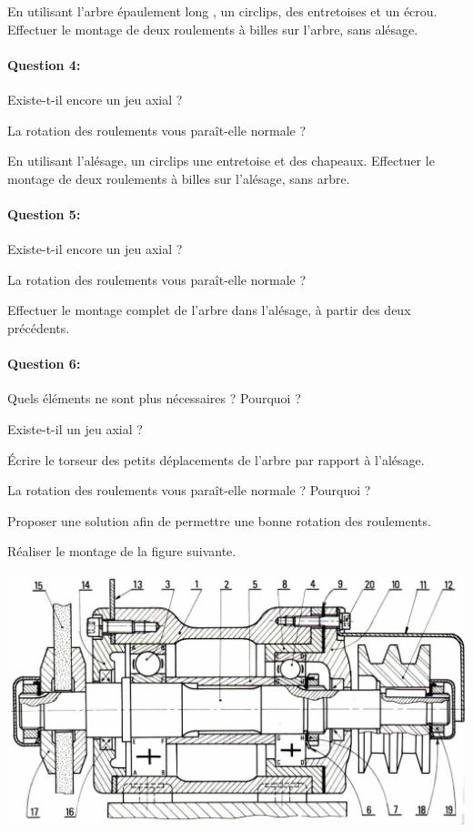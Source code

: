 En utilisant l'arbre \og épaulement long \fg, un circlips, des entretoises et un écrou.
Effectuer le montage de deux roulements à billes sur l'arbre, sans alésage.

\paragraph{Question 4:} Existe-t-il encore un jeu axial ?

La rotation des roulements vous paraît-elle normale ?

En utilisant l'alésage, un circlips une entretoise et des chapeaux. Effectuer le montage de deux roulements à billes sur l'alésage, sans arbre.

\paragraph{Question 5:} Existe-t-il encore un jeu axial ?

La rotation des roulements vous paraît-elle normale ?

Effectuer le montage complet de l'arbre dans l'alésage, à partir des deux précédents.

\paragraph{Question 6:} Quels éléments ne sont plus nécessaires ? Pourquoi ?

Existe-t-il un jeu axial ?

Écrire le torseur des petits déplacements de l'arbre par rapport à l'alésage.

La rotation des roulements vous paraît-elle normale ? Pourquoi ?

Proposer une solution afin de permettre une bonne rotation des roulements.

Réaliser le montage de la figure suivante.

\begin{center}
\includegraphics[width=0.6\linewidth]{img/Roulement1.jpg}
\end{center}

